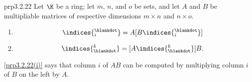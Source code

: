 \begin{prp}{}{prp3.2.22}
	Let $\K$ be a ring; let $m$, $n$, and $o$ be sets, and let $A$ and $B$ be multipliable matrices of respective dimensions $m\times n$ and $n\times o$.
	\begin{enumerate}
		\item \label{prp3.2.22(i)}
		\begin{equation}
			[AB]\indices{^{\blankdot}_i}=A[B\indices{^{\blankdot}_i}]
		\end{equation}
		\item \label{prp3.2.22(ii)}
		\begin{equation}
			[AB]\indices{^k_{\blankdot}}=[A\indices{^k_{\blankdot}}]B.
		\end{equation}
	\end{enumerate}
	\begin{rmk}
		\cref{prp3.2.22(i)} says that column $i$ of $AB$ can be computed by multiplying column $i$ of $B$ on the left by $A$.
		

\end{rmk}
\end{prp}
